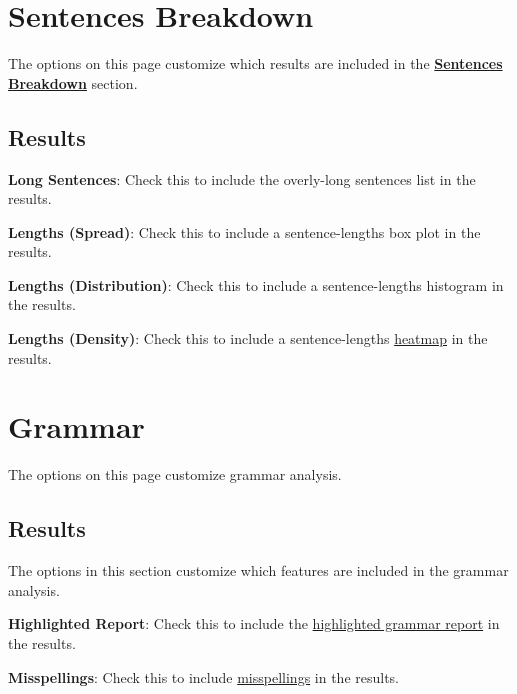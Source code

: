 \documentclass[
]{book}
\theoremstyle{definition}
\theoremstyle{definition}
\theoremstyle{definition}
\theoremstyle{definition}
\theoremstyle{remark}
\begin{document}
\hypertarget{options-sentences-breakdown}{%
\section{Sentences Breakdown}\label{options-sentences-breakdown}}

The options on this page customize which results are included in the \protect\hyperlink{reviewing-sentences-breakdown}{\textbf{Sentences Breakdown}} section.

\hypertarget{results-2}{%
\subsection*{Results}\label{results-2}}

\textbf{Long Sentences}: Check this to include the overly-long sentences list in the results.

\textbf{Lengths (Spread)}: Check this to include a sentence-lengths box plot in the results.

\textbf{Lengths (Distribution)}: Check this to include a sentence-lengths histogram in the results.

\textbf{Lengths (Density)}: Check this to include a sentence-lengths \protect\hyperlink{reviewing-sentences-breakdown}{heatmap} in the results.

\newpage

\hypertarget{options-grammar}{%
\section{Grammar}\label{options-grammar}}

The options on this page customize grammar analysis.

\hypertarget{results-3}{%
\subsection*{Results}\label{results-3}}

The options in this section customize which features are included in the grammar analysis.

\textbf{Highlighted Report}: Check this to include the \protect\hyperlink{reviewing-standard-grammar}{highlighted grammar report} in the results.

\textbf{Misspellings}: Check this to include \protect\hyperlink{reviewing-misspellings}{misspellings} in the results.
\end{document}
